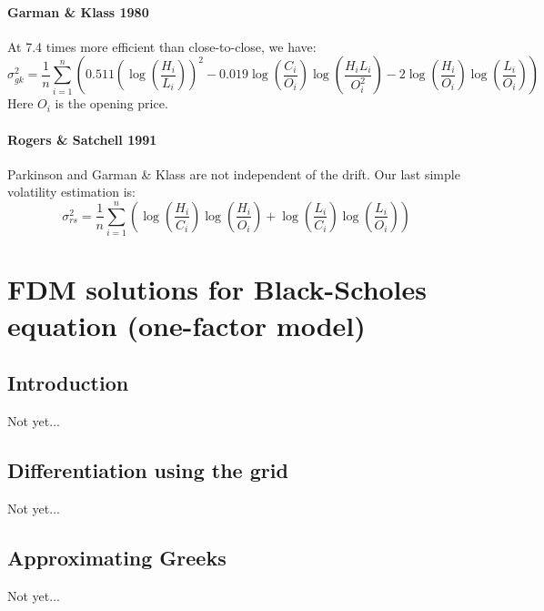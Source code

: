 \paragraph{Garman \& Klass 1980}
At 7.4 times more efficient than close-to-close, we have:
\begin{equation}
	\sigma_{gk}^2 = \frac{1}{n} \sum_{i=1}^n \left( 0.511 \left( \log \left( \frac{H_i}{L_i} \right) \right)^2 - 0.019 \log \left( \frac{C_i}{O_i} \right) \log \left( \frac{H_i L_i}{O_i^2} \right) - 2 \log \left( \frac{H_i}{O_i} \right) \log \left( \frac{L_i}{O_i} \right) \right)
\end{equation}
Here $O_i$ is the opening price.


\paragraph{Rogers \& Satchell 1991}
Parkinson and Garman \& Klass are not independent of the drift. Our last simple volatility estimation is:
\begin{equation}
	\sigma_{rs}^2 = \frac{1}{n} \sum_{i=1}^n \left( \log \left( \frac{H_i}{C_i} \right) \log \left( \frac{H_i}{O_i} \right) + \log \left( \frac{L_i}{C_i} \right) \log \left( \frac{L_i}{O_i} \right) \right)
\end{equation}



\section{FDM solutions for Black-Scholes equation (one-factor model)}
\cite{platen_numericalsde_1977, gm_numericalsde_1994, dh_introsde_2001, hg_sdematlab_2006, sm_introsde_2010, mb_numericalsde_2018}

\subsection{Introduction}
Not yet...



\subsection{Differentiation using the grid}
Not yet...



\subsection{Approximating Greeks}
Not yet...



